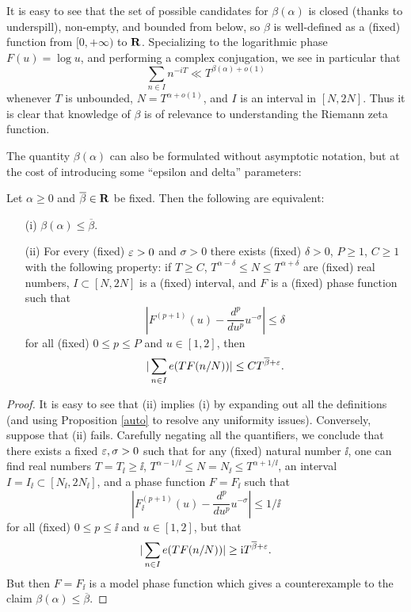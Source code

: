 
It is easy to see that the set of possible candidates for $\beta(\alpha)$ is closed (thanks to underspill), non-empty, and bounded from below, so $\beta$ is well-defined as a (fixed) function from $[0,+\infty)$ to $\mathbf{R}$.  Specializing to the logarithmic phase $F(u) = \log u$, and performing a complex conjugation, we see in particular that
\begin{equation}\label{beta-alpha}
    \sum_{n \in I} n^{-iT} \ll T^{\beta(\alpha)+o(1)}
\end{equation}
whenever $T$ is unbounded, $N = T^{\alpha+o(1)}$, and $I$ is an interval in $[N,2N]$.  Thus it is clear that knowledge of $\beta$ is of relevance to understanding the Riemann zeta function.


The quantity $\beta(\alpha)$ can also be formulated without asymptotic notation, but at the cost of introducing some ``epsilon and delta'' parameters:

\begin{lemma}\label{beta-asymp}  Let $\alpha \geq 0$ and $\overline{\beta} \in \mathbf{R}$ be fixed.  Then the following are equivalent:
\begin{itemize}
\item[(i)] $\beta(\alpha) \leq \overline{\beta}$.
\item[(ii)] For every (fixed) $\varepsilon>0$ and $\sigma > 0$ there exists (fixed) $\delta>0$, $P \geq 1$, $C \geq 1$ with the following property: if $T \geq C$, $T^{\alpha-\delta} \leq N \leq T^{\alpha+\delta}$ are (fixed) real numbers, $I \subset [N,2N]$ is a (fixed) interval, and $F$ is a (fixed) phase function such that
\begin{equation}\label{fpu-bound}
     \left|F^{(p+1)}(u) - \frac{d^p}{du^p} u^{-\sigma}\right| \leq \delta
\end{equation}
for all (fixed) $0 \leq p \leq P$ and $u \in [1,2]$, then
$$ |\sum_{n \in I} e(T F(n/N))| \leq C T^{\overline{\beta}+\varepsilon}.$$
\end{itemize}
\end{lemma}

\begin{proof}  It is easy to see that (ii) implies (i) by expanding out all the definitions (and using Proposition \ref{auto} to resolve any uniformity issues).  Conversely, suppose that (ii) fails.  Carefully negating all the quantifiers, we conclude that there exists a fixed $\varepsilon, \sigma > 0$ such that for any (fixed) natural number $\ii$, one can find real numbers $T = T_{\ii} \geq \ii$, $T^{\alpha-1/\ii} \leq N = N_{\ii} \leq T^{\alpha+1/\ii}$, an interval $I = I_{\ii} \subset [N_\ii, 2N_\ii]$, and a phase function $F = F_{\ii}$ such that
$$ |F_\ii^{(p+1)}(u) - \frac{d^p}{du^p} u^{-\sigma}| \leq 1/\ii$$
for all (fixed) $0 \leq p \leq \ii$ and $u \in [1,2]$, but that
$$ |\sum_{n \in I} e(T F(n/N))| \geq {\mathrm{i}} T^{\overline{\beta}+\varepsilon}.$$
But then $F = F_\ii$ is a model phase function which gives a counterexample to the claim $\beta(\alpha) \leq \overline{\beta}$.
\end{proof}

